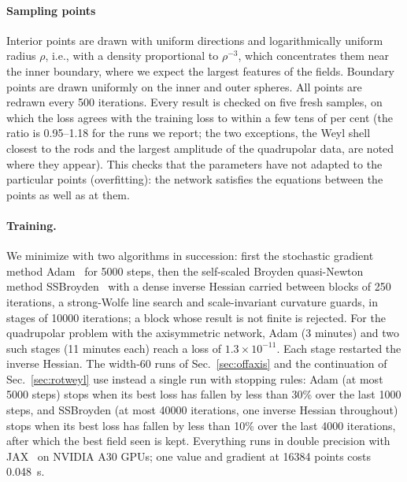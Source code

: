 \documentclass[aps,prd,twocolumn,superscriptaddress, nofootinbib,floatfix]{revtex4-2}
\begin{document}
\paragraph{Sampling points} Interior points are drawn with uniform directions and logarithmically uniform radius $\rho$, i.e., with a density proportional to $\rho^{-3}$, which concentrates them near the inner boundary, where we expect the largest features of the fields.
Boundary points are drawn uniformly on the inner and outer spheres.
All points are redrawn every 500 iterations.
Every result is checked on five fresh samples, on which the loss agrees with the training loss to within a few tens of per cent (the ratio is 0.95--1.18 for the runs we report; the two exceptions, the Weyl shell closest to the rods and the largest amplitude of the quadrupolar data, are noted where they appear).
This checks that the parameters have not adapted to the particular points (overfitting): the network satisfies the equations between the points as well as at them.

\paragraph{Training.} We minimize with two algorithms in succession: first the stochastic gradient method Adam~\cite{KingmaBa2014} for 5000 steps, then the self-scaled Broyden quasi-Newton method SSBroyden~\cite{Urban2025SSBroyden,Carretero2026} with a dense inverse Hessian carried between blocks of 250 iterations, a strong-Wolfe line search and scale-invariant curvature guards, in stages of 10000 iterations; a block whose result is not finite is rejected.
For the quadrupolar problem with the axisymmetric network, Adam (3 minutes) and two such stages (11 minutes each) reach a loss of $1.3\times10^{-11}$.
Each stage restarted the inverse Hessian.
The width-60 runs of Sec.~\ref{sec:offaxis} and the continuation of Sec.~\ref{sec:rotweyl} use instead a single run with stopping rules: Adam (at most 5000 steps) stops when its best loss has fallen by less than 30\% over the last 1000 steps, and SSBroyden (at most 40000 iterations, one inverse Hessian throughout) stops when its best loss has fallen by less than 10\% over the last 4000 iterations, after which the best field seen is kept.
Everything runs in double precision with JAX~\cite{jax2018} on NVIDIA A30 GPUs; one value and gradient at 16384 points costs 0.048~s.
\end{document}
